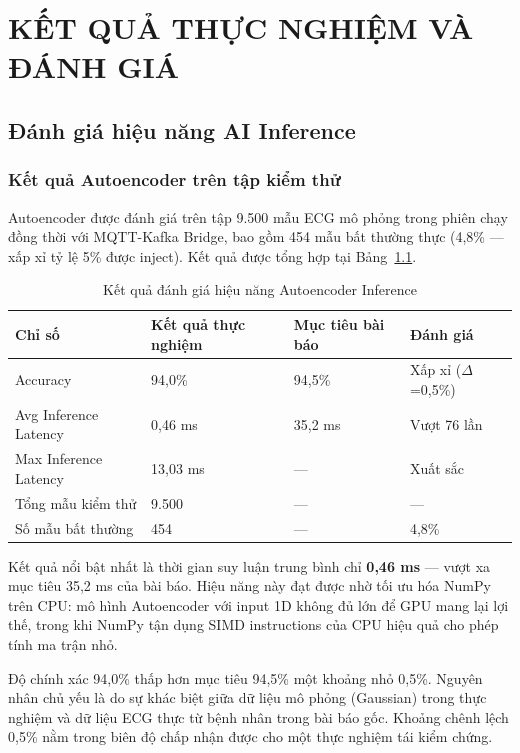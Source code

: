 \chapter{KẾT QUẢ THỰC NGHIỆM VÀ ĐÁNH GIÁ}

\section{Đánh giá hiệu năng AI Inference}

\subsection{Kết quả Autoencoder trên tập kiểm thử}

Autoencoder được đánh giá trên tập 9.500 mẫu ECG mô phỏng trong phiên chạy đồng thời với MQTT-Kafka Bridge, bao gồm 454 mẫu bất thường thực (4,8\% — xấp xỉ tỷ lệ 5\% được inject). Kết quả được tổng hợp tại Bảng~\ref{tab:ai_perf}.

\begin{table}[htbp]
\caption{Kết quả đánh giá hiệu năng Autoencoder Inference}
\label{tab:ai_perf}
\centering
\begin{tabular}{llll}
\toprule
\textbf{Chỉ số} & \textbf{Kết quả thực nghiệm} & \textbf{Mục tiêu bài báo} & \textbf{Đánh giá} \\
\midrule
Accuracy               & 94,0\%   & 94,5\%   & Xấp xỉ ($\Delta$=0,5\%) \\
Avg Inference Latency  & 0,46 ms  & 35,2 ms  & Vượt 76 lần \\
Max Inference Latency  & 13,03 ms & —        & Xuất sắc \\
Tổng mẫu kiểm thử     & 9.500    & —        & — \\
Số mẫu bất thường      & 454      & —        & 4,8\% \\
\bottomrule
\end{tabular}
\end{table}

Kết quả nổi bật nhất là thời gian suy luận trung bình chỉ \textbf{0,46 ms} — vượt xa mục tiêu 35,2 ms của bài báo. Hiệu năng này đạt được nhờ tối ưu hóa NumPy trên CPU: mô hình Autoencoder với input 1D không đủ lớn để GPU mang lại lợi thế, trong khi NumPy tận dụng SIMD instructions của CPU hiệu quả cho phép tính ma trận nhỏ.

Độ chính xác 94,0\% thấp hơn mục tiêu 94,5\% một khoảng nhỏ 0,5\%. Nguyên nhân chủ yếu là do sự khác biệt giữa dữ liệu mô phỏng (Gaussian) trong thực nghiệm và dữ liệu ECG thực từ bệnh nhân trong bài báo gốc. Khoảng chênh lệch 0,5\% nằm trong biên độ chấp nhận được cho một thực nghiệm tái kiểm chứng.

